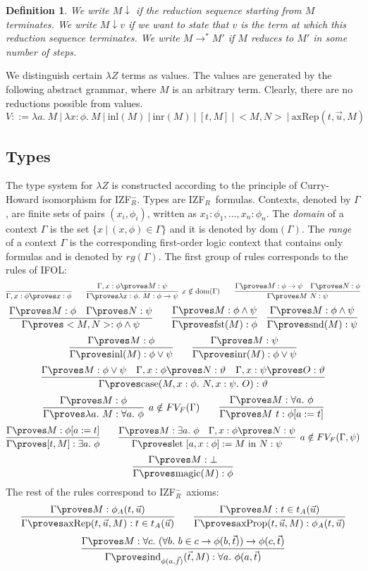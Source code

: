 \documentclass{LMCS}
\newtheorem{definition}[thm]{Definition}
\newcommand{\todo}[1]{}
\newcommand{\p}{\proves}
\newcommand{\g}{\Gamma}
\newcommand{\gp}{\Gamma \proves}
\newcommand{\pl}[1]{\ensuremath{\mathrm{#1}}}
\newcommand{\FST}{\pl{fst}}
\newcommand{\SND}{\pl{snd}}
\newcommand{\LET}{\pl{let}}
\newcommand{\CASE}{\pl{case}}\newcommand{\DOM}{\pl{dom}}
\newcommand{\MAGIC}{\pl{magic}}
\newcommand{\INL}{\pl{inl}}
\newcommand{\INR}{\pl{inr}}
\newcommand{\IN}{\pl{in}}
\newcommand{\IND}{\pl{ind}}
\newcommand{\izfr}{IZF${}_R$}
\newcommand{\iizfr}{IZF${}_R^{-}$}
\newcommand{\li}{\lambda Z}
\begin{document}
\begin{definition}
We write $M \downarrow$ if the reduction sequence starting from $M$
terminates. We write $M \downarrow v$ if we want to state that $v$
is the term at which this reduction sequence terminates. We write $M \to^* M'$ if
$M$ reduces to $M'$ in some number of steps. \todo{Better formulation?}
\end{definition}

We distinguish certain $\li$ terms as values. The values are generated
by the following abstract grammar, where $M$ is an arbitrary term. Clearly, there are
no reductions possible from values. 
\[
V ::= \lambda a.\ M\ |\ \lambda x : \phi.\ M\ |\ \INL(M)\ |\ \INR(M) \ |\
[t, M]\ |\ <M, N>\ |\ \pl{axRep}(t, \vec{u}, M)
\]

\subsection{Types}\label{lambdaa}

The type system for $\li$ is constructed according to the principle
of Curry-Howard isomorphism for \iizfr. Types are \izfr\ formulas.
Contexts, denoted by $\g$, are finite sets of pairs $(x_i, \phi_i)$, written
as $x_1 : \phi_1, {\ldots} , x_n : \phi_n$. The \emph{domain} of a context
$\g$ is the set $\{ x\ |\ (x, \phi) \in \g \}$ and it is denoted by $\DOM(\g)$.  The \emph{range} of a context $\g$ is the corresponding first-order logic context that contains
only formulas and is denoted by $rg(\g)$. The first group of rules
corresponds to the rules of IFOL:
\[
\infer{\g, x : \phi \p x : \phi}{} \qquad 
\infer[x \notin \DOM(\g)]{\gp \lambda x : \phi.\ M : \phi \to
\psi}{\g, x : \phi \p M : \psi} \qquad
\infer{\gp M\ N : \psi}{\gp M : \phi \to
\psi & \gp N : \phi} 
\]
\[
\infer{\gp <M, N> : \phi \land \psi}{\gp M : \phi & \gp N : \psi}
\qquad 
\infer{\gp \FST(M) : \phi}{\gp M : \phi \land \psi} \quad \infer{\gp \SND(M) :
\psi}{\gp M : \phi \land \psi} 
\]
\[
\infer{\gp \INL(M) : \phi \lor \psi}{\gp M : \phi} \qquad \infer{\gp \INR(M)
: \phi \lor \psi}{\gp M : \psi} 
\]
\[
\infer{\gp \CASE(M, x : \phi.\ N, x : \psi.\ O) : \vartheta}{\gp M :
\phi \lor \psi & \g, x : \phi \proves N : \vartheta & \g, x : \psi \proves O : \vartheta}
\]
\[
\infer[a \notin FV_F(\g)]{\gp \lambda a.\ M : \forall a.\ \phi}{\g \proves M : \phi}
\qquad 
\infer{\gp M\ t : \phi[a:=t]}{\gp M : \forall a.\ \phi}
\]
\[
\infer{\gp [t, M] : \exists a.\ \phi}{\gp M : \phi[a:=t]} \qquad 
\infer[a \notin FV_F(\g, \psi)]{\gp \LET\ [a, x : \phi] := M\ \IN\
N : \psi}{\gp M : \exists a.\ \phi & \g,  x : \phi \proves N : \psi} 
\]
\[
\infer{\gp \MAGIC(M) : \phi}{\gp M : \bot}
\]
The rest of the rules correspond to \iizfr\ axioms:
\[
\infer{\gp \pl{axRep}(t, \vec{u}, M) : t \in t_A(\vec{u})}{\gp M : \phi_A(t,
\vec{u})} \qquad \infer{\gp \pl{axProp}(t, \vec{u}, M) : \phi_A(t, \vec{u}) }{ \gp M : t \in
t_A(\vec{u})}
\]
\[
\infer{\gp \IND_{\phi(a, \vec{f})}(\vec{t}, M) : \forall a.\
\phi(a, \vec{t})}{\gp M : \forall c.\ (\forall b.\ b \in c \to \phi(b,
\vec{t})) \to \phi(c, \vec{t})} 
\]
\end{document}
